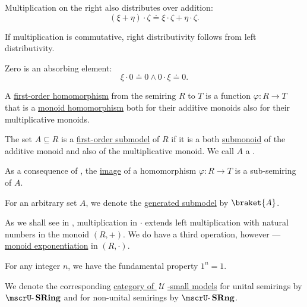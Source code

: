 \begin{definition}
\begin{thmenum}
\begin{thmenum}
       Multiplication on the right also distributes over addition:
      \begin{equation}\label{eq:def:semiring/right_distributivity}
        (\xi + \eta) \cdot \zeta \doteq \xi \cdot \zeta + \eta \cdot \zeta.
      \end{equation}

      If multiplication is commutative, right distributivity follows from left distributivity.

       Zero is an absorbing element:
      \begin{equation}\label{eq:def:semiring/absorption}
        \xi \cdot 0 \doteq 0 \wedge 0 \cdot \xi \doteq 0.
      \end{equation}
    \end{thmenum}

     A \hyperref[def:first_order_homomorphism]{first-order homomorphism} from the semiring \( R \) to \( T \) is a function \( \varphi: R \to T \) that is a \hyperref[def:monoid/homomorphism]{monoid homomorphism} both for their additive monoids also for their multiplicative monoids.

     The set \( A \subseteq R \) is a \hyperref[def:first_order_submodel]{first-order submodel} of \( R \) if it is a both \hyperref[def:monoid/submodel]{submonoid} of the additive monoid and also of the multiplicative monoid. We call \( A \) a .

    As a consequence of , the \hyperref[def:set_valued_map/image]{image} of a homomorphism \( \varphi: R \to T \) is a sub-semiring of \( A \).

     For an arbitrary set \( A \), we denote the \hyperref[def:first_order_generated_substructure]{generated submodel} by \( \braket{ A } \).

     As we shall see in , multiplication in \( \cdot \) extends left multiplication with natural numbers in the monoid \( (R, +) \). We do have a third operation, however --- \hyperref[def:monoid/exponentiation]{monoid exponentiation} in \( (R, \cdot) \).

    For any integer \( n \), we have the fundamental property \( 1^n = 1 \).

     We denote the corresponding \hyperref[def:category_of_small_first_order_models]{category of \( \mscrU \)-small models} for unital semirings by \( \ucat{SRing} \) and for non-unital semirings by \( \ucat{SRng} \).


\end{thmenum}
\end{definition}
